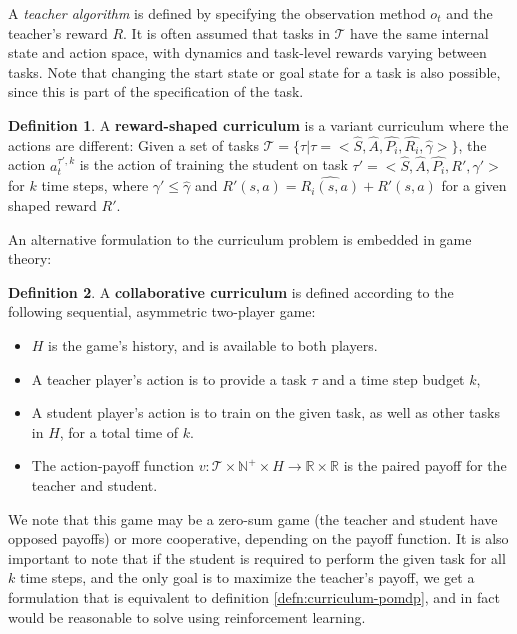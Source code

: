 \documentclass[letterpaper]{article}
\theoremstyle{definition}
\newtheorem{defn}{Definition}[section]
\begin{document}
A \textit{teacher algorithm} is defined by specifying the observation method $o_t$ and the teacher's reward $R$. It is often assumed that tasks in $\mathcal{T}$ have the same internal state and action space, with dynamics and task-level rewards varying between tasks.
Note that changing the start state or goal state for a task is also possible, since this is part of the specification of the task.

\begin{defn} \label{defn:curriculum-pomdp-shaping}
	A \textbf{reward-shaped curriculum} is a variant curriculum where the actions are different:
	Given a set of tasks $\mathcal{T}=\{\tau|\tau=<\hat{S},\hat{A},\hat{P_i},\hat{R_i},\hat{\gamma}>\}$, the action $a_{t}^{\tau', k}$ is the action of training the student on task $\tau'=<\hat{S},\hat{A},\hat{P_i},R',\gamma'>$ for $k$ time steps, where $\gamma'\leq \hat{\gamma}$ and $R'(s,a)=\hat{R_i(s,a)}+R'(s,a)$ for a given shaped reward $R'$.
\end{defn}

An alternative formulation to the curriculum problem is embedded in game theory:
\begin{defn} \label{defn:curriculum-game-theory}
	A \textbf{collaborative curriculum} is defined according to the following sequential, asymmetric two-player game:
	\begin{itemize}
	\item $H$ is the game's history, and is available to both players.
	\item A teacher player's action is to provide a task $\tau$ and a time step budget $k$,
	\item A student player's action is to train on the given task, as well as other tasks in $H$, for a total time of $k$.
	\item The action-payoff function $v:\mathcal{T}\times \mathbb{N^+} \times H \rightarrow \mathbb{R}\times \mathbb{R}$ is the paired payoff for the teacher and student. 
	\end{itemize}
\end{defn}

We note that this game may be a zero-sum game (the teacher and student have opposed payoffs) or more cooperative, depending on the payoff function.
It is also important to note that if the student is required to perform the given task for all $k$ time steps, and the only goal is to maximize the teacher's payoff, we get a formulation that is equivalent to definition \ref{defn:curriculum-pomdp}, and in fact would be reasonable to solve using reinforcement learning.
\end{document}
